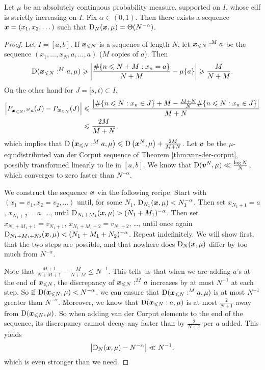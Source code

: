 \begin{theorem}\label{thm:discrepancy-arbitrary}
Let $\mu$ be an absolutely continuous probability measure, supported on $I$, 
whose cdf is strictly increasing on $I$. Fix $\alpha\in (0,1)$. Then there 
exists a sequence ${\boldsymbol x}=(x_1,x_2,\dots)$ such that 
$\operatorname{D}_N({\boldsymbol x},\mu) = \Theta(N^{-\alpha})$. 
\end{theorem}
\begin{proof}
Let $I = [a,b]$. If ${\boldsymbol x}_{\leqslant N}$ is a sequence of length $N$, let 
${\boldsymbol x}_{\leqslant N}:^M a$ be the sequence $(x_1,\dots,x_N,a,\dots,a)$ ($M$ copies 
of $a$). Then 
\[
	\operatorname{D}({\boldsymbol x}_{\leqslant N}:^M a,\mu)
		\geqslant \left| \frac{\#\{ n\leqslant N+M : x_n = a\}}{N+M} - \mu\{a\}\right| 
		\geqslant \frac{M}{N+M} .
\]
On the other hand for $J = [s,t)\subset I$, 
\begin{align*}
	\left| P_{{\boldsymbol x}_{\leqslant N}:^M a}(J) - P_{{\boldsymbol x}_{\leqslant N}}(J)\right| 
		&\leqslant \frac{\left|\#\{n\leqslant N : x_n\in J\} + M - \frac{M+N}{N}\#\{n\leqslant N : x_n\in J\}\right|}{M+N} \\
		&\leqslant \frac{2M}{M+N} ,
\end{align*}
which implies that 
$\operatorname{D}\left({\boldsymbol x}_{\leqslant N}:^M a,\mu\right) \leqslant \operatorname{D}\left({\boldsymbol x}^N,\mu\right) + \frac{2 M}{M+N}$. 
Let ${\boldsymbol v}$ be the $\mu$-equidistributed van der Corput sequence of 
Theorem \ref{thm:van-der-corput}, possibly transformed linearly to lie in 
$[a,b]$. We know that $\operatorname{D}({\boldsymbol v}^N, \mu) \ll \frac{\log N}{N}$, which converges 
to zero faster than $N^{-\alpha}$. 

We construct the sequence ${\boldsymbol x}$ via the following recipe. Start with 
$(x_1 = v_1,x_2 = v_2,\dots)$ until, for some $N_1$, 
$\operatorname{D}_{N_1}({\boldsymbol x},\mu) < N_1^{-\alpha}$. Then set $x_{N_1+1} = a$, 
$x_{N_1+2} = a$, \dots, until 
$\operatorname{D}_{N_1+M_1}({\boldsymbol x},\mu) > (N_1+M_1)^{-\alpha}$. Then set 
$x_{N_1+M_1+1} = v_{N_1+1}$, $x_{N_1+M_1+2} = v_{N_1+2}$, \dots, 
until once again 
$\operatorname{D}_{N_1+M_1+N_2}({\boldsymbol x},\mu) < (N_1+M_1+N_2)^{-\alpha}$. Repeat 
indefinitely. We will show first, that the two steps are possible, and that 
nowhere does $\operatorname{D}_N({\boldsymbol x},\mu)$ differ by too much from $N^{-\alpha}$. 

Note that $\frac{M+1}{N+M+1} - \frac{M}{N+M} \leqslant N^{-1}$. This tells 
us that when we are adding $a$'s at the end of ${\boldsymbol x}_{\leqslant N}$, the 
discrepancy of 
${\boldsymbol x}_{\leqslant N}:^M a$ increases by at most $N^{-1}$ at each 
step. So if $\operatorname{D}({\boldsymbol x}_{\leqslant N},\mu) < N^{-\alpha}$, we can ensure that 
$\operatorname{D}({\boldsymbol x}_{\leqslant N}:^M a,\mu)$ is at most $N^{-1}$ greater than 
$N^{-\alpha}$. 
Moreover, we know that $\operatorname{D}({\boldsymbol x}_{\leqslant N}:a,\mu)$ is at most 
$\frac{2}{N+1}$ away from $\operatorname{D}({\boldsymbol x}_{\leqslant N},\mu)$. So when adding van der 
Corput elements to the end of the sequence, its discrepancy cannot decay any 
faster than by $\frac{2}{N+1}$ per $a$ added. This yields 
\[
	\left|\operatorname{D}_N({\boldsymbol x},\mu) - N^{-\alpha}\right| \ll N^{-1} , 
\]
which is even stronger than we need.
\end{proof}
